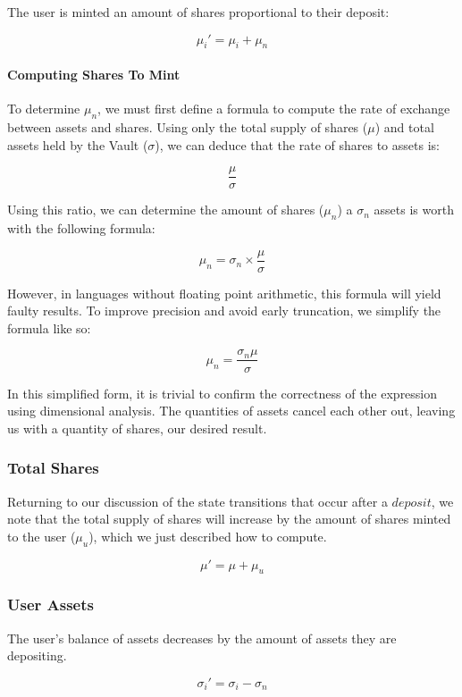 \documentclass{article}
\begin{document}
The user is minted an amount of shares proportional to their deposit:

$$ \mu_i' = \mu_i + \mu_n $$

\paragraph{Computing Shares To Mint}

To determine $\mu_n$, we must first define a formula to compute the rate of exchange between assets and shares. Using only the total supply of shares ($\mu$) and total assets held by the Vault ($\sigma$), we can deduce that the rate of shares to assets is:

$$ \frac{\mu}{\sigma} $$

Using this ratio, we can determine the amount of shares ($\mu_n$) a $\sigma_n$ assets is worth with the following formula:

$$ \mu_n = \sigma_n \times \frac{\mu}{\sigma} $$

However, in languages without floating point arithmetic, this formula will yield faulty results. To improve precision and avoid early truncation, we simplify the formula like so:

$$ \mu_n = \frac{\sigma_n\mu}{\sigma} $$

In this simplified form, it is trivial to confirm the correctness of the expression using dimensional analysis. The quantities of assets cancel each other out, leaving us with a quantity of shares, our desired result.

\subsubsection{Total Shares}

Returning to our discussion of the state transitions that occur after a $deposit$, we note that the total supply of shares will increase by the amount of shares minted to the user ($\mu_{u}$), which we just described how to compute.

$$ \mu' = \mu + \mu_{u} $$

\subsubsection{User Assets}

The user's balance of assets decreases by the amount of assets they are depositing.

$$ \sigma_i' = \sigma_i - \sigma_n $$
\end{document}
